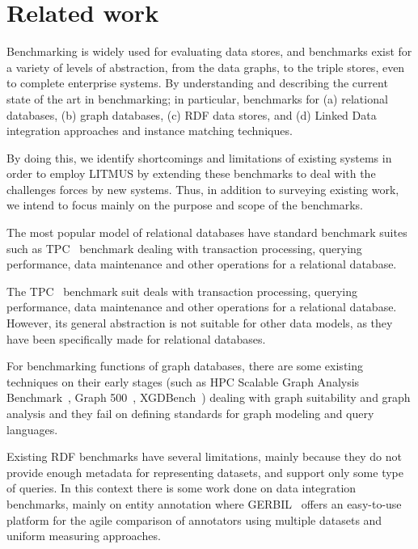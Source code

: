 \documentclass{llncs}
\begin{document}
\section{Related work}\label{relwork}

    Benchmarking is widely used for evaluating data stores, and benchmarks exist for a variety of levels of abstraction, from the data graphs, to the triple stores, even to complete enterprise systems.
    By understanding and describing the current state of the art in benchmarking; in particular, benchmarks for (a) relational databases, (b) graph databases, (c) RDF data stores, and (d) Linked Data integration approaches and instance matching techniques.
    
    By doing this, we identify shortcomings and limitations of existing systems in order to employ LITMUS by extending these benchmarks to deal with the challenges forces by new systems.
    Thus, in addition to surveying existing work, we intend to focus mainly on the purpose and scope of the benchmarks.
    
    The most popular model of relational databases have standard benchmark suites such as TPC~\cite{Nambiar2011} benchmark dealing with transaction processing, querying performance, data maintenance and other operations for a relational database.
    
    The TPC~\cite{Nambiar2011} benchmark suit deals with transaction processing, querying performance, data maintenance and other operations for a relational database.
    However, its general abstraction is not suitable for other data models, as they have been specifically made for relational databases.
    
    For benchmarking functions of graph databases, there are some existing techniques on their early stages (such as HPC Scalable Graph Analysis Benchmark~\cite{Dominguez-Sal:2010:SGD:1927585.1927590}, Graph 500~\cite{murphy2010introducing}, XGDBench~\cite{conf/cloudcom/DayarathnaS12}) dealing with graph suitability and graph analysis and they fail on defining standards for graph modeling and query languages.
    
    Existing RDF benchmarks have several limitations, mainly because they do not provide enough metadata for representing datasets, and support only some type of queries.
    In this context there is some work done on data integration benchmarks, mainly on entity annotation where GERBIL~\cite{Usbeck:2015:GGE:2736277.2741626} offers an easy-to-use platform for the agile comparison of annotators using multiple datasets and uniform measuring approaches.
    
\end{document}
